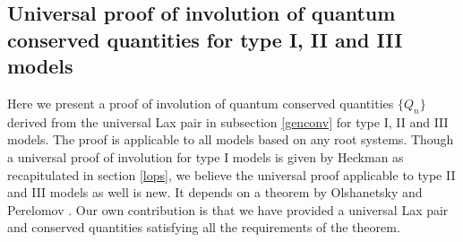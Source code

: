 \documentclass[a4paper,12pt]{article}
\begin{document}
\subsection{Universal proof of involution of quantum conserved quantities
for
type I, II and III models}
\label{uniproof}
Here we present a proof of involution of quantum conserved quantities
\(\{Q_n\}\)
derived from the universal Lax pair in subsection \ref{genconv}
for type I, II and III models.
The proof is applicable to all models based on any root systems.
Though a universal proof of involution for type I models is given by Heckman
\cite{Heck2} as recapitulated in section \ref{lops}, we believe the
universal
proof applicable to type II and III models as well is new.
It depends on a theorem by Olshanetsky and Perelomov \cite{OP3}.
Our own contribution is that we have provided a universal
Lax pair and conserved
quantities satisfying all the requirements of the theorem.
\end{document}
